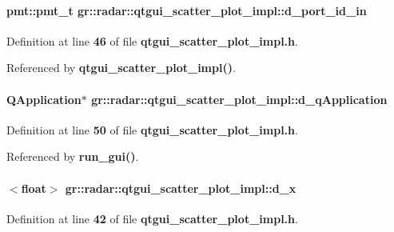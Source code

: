 \paragraph[{d\+\_\+port\+\_\+id\+\_\+in}]{\setlength{\rightskip}{0pt plus 5cm}pmt\+::pmt\+\_\+t gr\+::radar\+::qtgui\+\_\+scatter\+\_\+plot\+\_\+impl\+::d\+\_\+port\+\_\+id\+\_\+in}\label{classgr_1_1radar_1_1qtgui__scatter__plot__impl_a629c1ae3c51104da1a585c4ac9d175c2}


Definition at line {\bf 46} of file {\bf qtgui\+\_\+scatter\+\_\+plot\+\_\+impl.\+h}.



Referenced by {\bf qtgui\+\_\+scatter\+\_\+plot\+\_\+impl()}.

\paragraph[{d\+\_\+q\+Application}]{\setlength{\rightskip}{0pt plus 5cm}Q\+Application$\ast$ gr\+::radar\+::qtgui\+\_\+scatter\+\_\+plot\+\_\+impl\+::d\+\_\+q\+Application}\label{classgr_1_1radar_1_1qtgui__scatter__plot__impl_a5b94c20da583e52a5c16e8239899664b}


Definition at line {\bf 50} of file {\bf qtgui\+\_\+scatter\+\_\+plot\+\_\+impl.\+h}.



Referenced by {\bf run\+\_\+gui()}.

\paragraph[{d\+\_\+x}]{$<$float$>$ gr\+::radar\+::qtgui\+\_\+scatter\+\_\+plot\+\_\+impl\+::d\+\_\+x}\label{classgr_1_1radar_1_1qtgui__scatter__plot__impl_a682b060ae9640b22a92935a48c4b925f}


Definition at line {\bf 42} of file {\bf qtgui\+\_\+scatter\+\_\+plot\+\_\+impl.\+h}.



